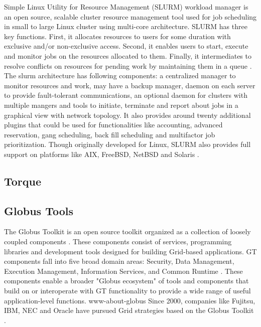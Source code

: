 {     Simple Linux Utility for Resource Management (SLURM) workload
     manager is an open source, scalable cluster resource management
     tool used for job scheduling in small to large Linux cluster
     using multi-core architecture. SLURM has three key
     functions. First, it allocates resources to users for some
     duration with exclusive and/or non-exclusive access. Second, it
     enables users to start, execute and monitor jobs on the resources
     allocated to them. Finally, it intermediates to resolve conflicts
     on resources for pending work by maintaining
     them in a queue \cite{www-slurmSchedmdSite}. The
     slurm architecture has following components: a centralized
     manager to monitor resources and work, may have a backup manager,
     daemon on each server to provide fault-tolerant communications,
     an optional daemon for clusters with multiple mangers and tools
     to initiate, terminate and report about jobs in a graphical view
     with network topology. It also provides around twenty additional
     plugins that could be used for functionalities like accounting,
     advanced reservation, gang scheduling, back fill scheduling and
     multifactor job prioritization. Though originally developed for
     Linux, SLURM also provides full support on platforms like AIX,
     FreeBSD, NetBSD and Solaris \cite{www-slurmPlatformsSite} \cite{www-slurm}.

     \pv
     
\subsection{Torque}

\pv 

\subsection{Globus Tools \cv}

     The Globus Toolkit is an open source
     toolkit organized as a collection of loosely coupled
     components  \cite{sotomayor2006globus}. These components consist of services, programming
     libraries and development tools designed for building Grid-based
     applications. GT components fall into five broad domain areas:
     Security, Data Management, Execution Management, Information
     Services, and Common Runtime \cite{foster2006globus}. These
     components enable a broader "Globus ecosystem" of tools and
     components that build on or interoperate with GT functionality to
     provide a wide range of useful application-level
     functions. www-about-globus Since 2000,
     companies like Fujitsu, IBM, NEC and Oracle have pursued Grid
     strategies based on the Globus Toolkit \cite{www-about-globus}.

}
